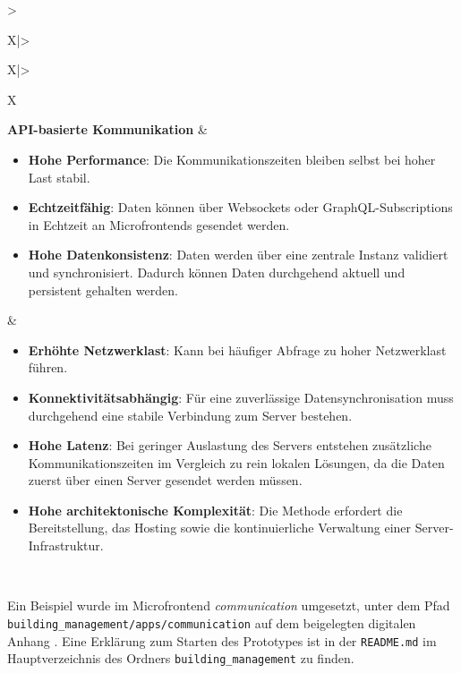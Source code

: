 \begin{xltabular}{\textwidth}{>{\hsize\raggedright\arraybackslash}X|>{\hsize\raggedright\arraybackslash}X|>{\hsize\raggedright\arraybackslash}X}
  \textbf{API-basierte Kommunikation} &
  \begin{itemize}[leftmargin=*]
    \item \textbf{Hohe Performance}: Die Kommunikationszeiten bleiben selbst bei hoher Last stabil.
    \item \textbf{Echtzeitfähig}: Daten können über Websockets oder GraphQL-Subscriptions in Echtzeit an Microfrontends gesendet werden.
    \item \textbf{Hohe Datenkonsistenz}: Daten werden über eine zentrale Instanz validiert und synchronisiert. Dadurch können Daten durchgehend aktuell und persistent gehalten werden.
  \end{itemize} &
  \begin{itemize}[leftmargin=*]
    \item \textbf{Erhöhte Netzwerklast}: Kann bei häufiger Abfrage zu hoher Netzwerklast führen.
    \item \textbf{Konnektivitätsabhängig}: Für eine zuverlässige Datensynchronisation muss durchgehend eine stabile Verbindung zum Server bestehen.
    \item \textbf{Hohe Latenz}: Bei geringer Auslastung des Servers entstehen zusätzliche Kommunikationszeiten im Vergleich zu rein lokalen Lösungen, da die Daten zuerst über einen Server gesendet werden müssen.
    \item \textbf{Hohe architektonische Komplexität}: Die Methode erfordert die Bereitstellung, das Hosting sowie die kontinuierliche Verwaltung einer Server-Infrastruktur.
  \end{itemize} \\ \hline
\end{xltabular}
\endgroup

Ein Beispiel wurde im Microfrontend \textit{communication} umgesetzt, unter dem Pfad \\ \texttt{building\_management/apps/communication} auf dem beigelegten digitalen Anhang \cite{eigener_code_usb}.
Eine Erklärung zum Starten des Prototypes ist in der \texttt{README.md} im Hauptverzeichnis des Ordners \texttt{building\_management} zu finden.
